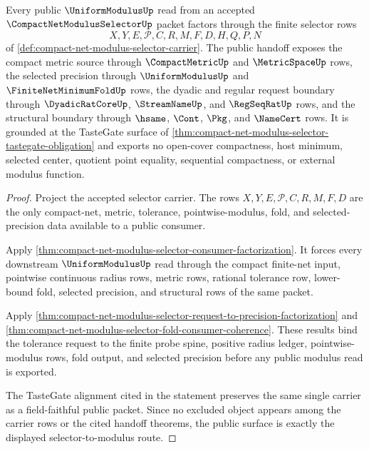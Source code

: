 \begin{theorem}
\label{thm:compactnetmodulusselector-public-modulus-handoff}
Every public $\UniformModulusUp$ read from an accepted $\CompactNetModulusSelectorUp$ packet factors through the finite selector rows
$$
X,Y,E,\mathcal{P},C,R,M,F,D,H,Q,P,N
$$
of \autoref{def:compact-net-modulus-selector-carrier}. The public handoff exposes the compact metric source through $\CompactMetricUp$ and $\MetricSpaceUp$ rows, the selected precision through $\UniformModulusUp$ and $\FiniteNetMinimumFoldUp$ rows, the dyadic and regular request boundary through $\DyadicRatCoreUp$, $\StreamNameUp$, and $\RegSeqRatUp$ rows, and the structural boundary through $\hsame$, $\Cont$, $\Pkg$, and $\NameCert$ rows. It is grounded at the TasteGate surface of \autoref{thm:compact-net-modulus-selector-tastegate-obligation} and exports no open-cover compactness, host minimum, selected center, quotient point equality, sequential compactness, or external modulus function.
\end{theorem}
\begin{proof}
Project the accepted selector carrier. The rows $X,Y,E,\mathcal{P},C,R,M,F,D$ are the only compact-net, metric, tolerance, pointwise-modulus, fold, and selected-precision data available to a public consumer.

Apply \autoref{thm:compact-net-modulus-selector-consumer-factorization}. It forces every downstream $\UniformModulusUp$ read through the compact finite-net input, pointwise continuous radius rows, metric rows, rational tolerance row, lower-bound fold, selected precision, and structural rows of the same packet.

Apply \autoref{thm:compact-net-modulus-selector-request-to-precision-factorization} and \autoref{thm:compact-net-modulus-selector-fold-consumer-coherence}. These results bind the tolerance request to the finite probe spine, positive radius ledger, pointwise-modulus rows, fold output, and selected precision before any public modulus read is exported.

The TasteGate alignment cited in the statement preserves the same single carrier as a field-faithful public packet. Since no excluded object appears among the carrier rows or the cited handoff theorems, the public surface is exactly the displayed selector-to-modulus route.
\end{proof}
